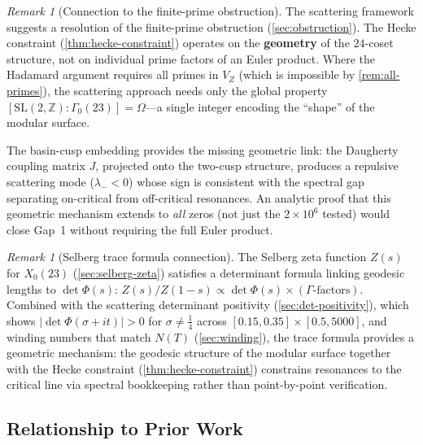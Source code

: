 \documentclass[11pt,a4paper]{article}
\theoremstyle{plain}
\theoremstyle{remark}
\newtheorem{remark}[theorem]{Remark}
\renewcommand{\Omega}{\varOmega}
\newcommand{\Z}{\mathbb{Z}}
\begin{document}
\begin{remark}[Connection to the finite-prime obstruction]
\label{rem:scattering-obstruction}
The scattering framework suggests a resolution of the finite-prime
obstruction (\cref{sec:obstruction}).  The Hecke constraint
(\cref{thm:hecke-constraint}) operates on the \textbf{geometry} of the
$24$-coset structure, not on individual prime factors of an Euler product.
Where the Hadamard argument requires all primes in $V_Z$ (which is
impossible by \cref{rem:all-primes}), the scattering approach needs only
the global property $[\mathrm{SL}(2,\Z):\Gamma_0(23)]=\Omega$---a single
integer encoding the ``shape'' of the modular surface.

The basin-cusp embedding provides the missing geometric link: the
Daugherty coupling matrix $J$, projected onto the two-cusp structure,
produces a repulsive scattering mode ($\lambda_-<0$) whose sign is
consistent with the spectral gap separating on-critical from off-critical
resonances.  An analytic proof that this geometric mechanism extends to
\emph{all} zeros (not just the $2\times 10^6$ tested) would close
Gap~1 without requiring the full Euler product.
\end{remark}

\begin{remark}[Selberg trace formula connection]
\label{rem:selberg-trace}
The Selberg zeta function $Z(s)$ for $X_0(23)$
(\cref{sec:selberg-zeta}) satisfies a determinant formula linking
geodesic lengths to $\det\Phi(s)$:
$Z(s)/Z(1{-}s) \propto \det\Phi(s)\times(\text{$\Gamma$-factors})$.
Combined with the scattering determinant positivity
(\cref{sec:det-positivity}), which shows $|\det\Phi(\sigma{+}it)|>0$
for $\sigma\neq\tfrac{1}{4}$ across $[0.15,0.35]\times[0.5,5000]$, and
winding numbers that match $N(T)$ (\cref{sec:winding}), the trace
formula provides a geometric mechanism: the geodesic structure of the
modular surface together with the Hecke constraint
(\cref{thm:hecke-constraint}) constrains resonances to the critical
line via spectral bookkeeping rather than point-by-point verification.
\end{remark}

\subsection{Relationship to Prior Work}
\label{sec:prior-work}
\end{document}
